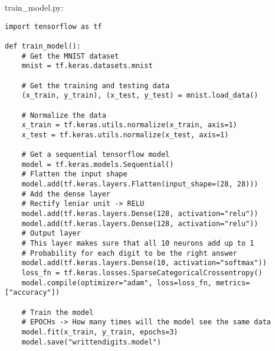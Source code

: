\documentclass{article}
\begin{document}
\begin{flushleft}
train\_model.py:
\end{flushleft}
\begin{verbatim}
import tensorflow as tf

def train_model():
    # Get the MNIST dataset
    mnist = tf.keras.datasets.mnist

    # Get the training and testing data
    (x_train, y_train), (x_test, y_test) = mnist.load_data()

    # Normalize the data
    x_train = tf.keras.utils.normalize(x_train, axis=1)
    x_test = tf.keras.utils.normalize(x_test, axis=1)

    # Get a sequential tensorflow model
    model = tf.keras.models.Sequential()
    # Flatten the input shape
    model.add(tf.keras.layers.Flatten(input_shape=(28, 28)))
    # Add the dense layer
    # Rectify leniar unit -> RELU
    model.add(tf.keras.layers.Dense(128, activation="relu"))
    model.add(tf.keras.layers.Dense(128, activation="relu"))
    # Output layer
    # This layer makes sure that all 10 neurons add up to 1
    # Probability for each digit to be the right answer
    model.add(tf.keras.layers.Dense(10, activation="softmax"))
    loss_fn = tf.keras.losses.SparseCategoricalCrossentropy()
    model.compile(optimizer="adam", loss=loss_fn, metrics=["accuracy"])

    # Train the model
    # EPOCHs -> How many times will the model see the same data
    model.fit(x_train, y_train, epochs=3)
    model.save("writtendigits.model")
\end{verbatim}
\end{document}
